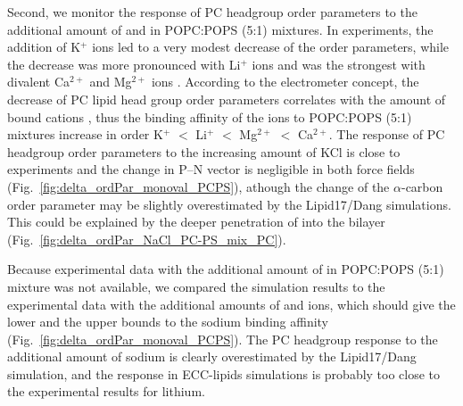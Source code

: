 \documentclass[journal=jpcbfk,manuscript=article]{achemso}
\begin{document}
Second, we monitor the response of PC headgroup order parameters to the additional
amount of  and  in POPC:POPS (5:1) mixtures.
In experiments, the addition of K$^+$ ions led to a very modest decrease of the order parameters,
while the decrease was more pronounced with Li$^+$ ions and was the strongest with divalent Ca$^{2+}$ and Mg$^{2+}$ ions \cite{roux90}.
According to the electrometer concept, the decrease of PC lipid head group order parameters
correlates with the amount of bound cations \cite{akutsu81,altenbach84,seelig87,roux90,catte16,NMRlipidsIV},
thus the binding affinity of the ions to POPC:POPS (5:1) mixtures increase in order K$^{+}$ $<$ Li$^{+}$  $<$ Mg$^{2+}$  $<$ Ca$^{2+}$.
The response of PC headgroup order parameters to the increasing amount of KCl is close to experiments
and the change in P--N vector is negligible in both force fields (Fig.~\ref{fig:delta_ordPar_monoval_PCPS}), athough the change of the $\alpha$-carbon
order parameter may be slightly overestimated by the Lipid17/Dang simulations. 
This could be explained by the deeper penetration of  into the bilayer (Fig.~\ref{fig:delta_ordPar_NaCl_PC-PS_mix_PC}).

Because experimental data with the additional amount of  in POPC:POPS (5:1) mixture was not available,
we compared the simulation results to the experimental data with the additional amounts of
 and  ions, which should give the lower and the upper bounds to the sodium binding
affinity (Fig.~\ref{fig:delta_ordPar_monoval_PCPS}). The PC headgroup response to the additional
amount of sodium is clearly overestimated by the Lipid17/Dang simulation, and
the response in ECC-lipids simulations is probably too close to the experimental results for lithium.




 
\end{document}
